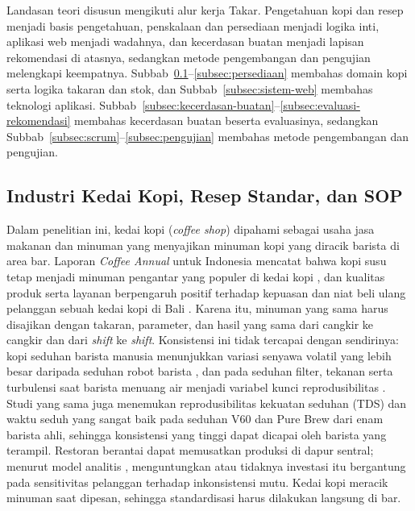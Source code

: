 Landasan teori disusun mengikuti alur kerja Takar. Pengetahuan kopi dan resep menjadi basis pengetahuan, penskalaan dan persediaan menjadi logika inti, aplikasi web menjadi wadahnya, dan kecerdasan buatan menjadi lapisan rekomendasi di atasnya, sedangkan metode pengembangan dan pengujian melengkapi keempatnya. Subbab~\ref{subsec:kedai-kopi}--\ref{subsec:persediaan} membahas domain kopi serta logika takaran dan stok, dan Subbab~\ref{subsec:sistem-web} membahas teknologi aplikasi. Subbab~\ref{subsec:kecerdasan-buatan}--\ref{subsec:evaluasi-rekomendasi} membahas kecerdasan buatan beserta evaluasinya, sedangkan Subbab~\ref{subsec:scrum}--\ref{subsec:pengujian} membahas metode pengembangan dan pengujian.

\subsection{Industri Kedai Kopi, Resep Standar, dan SOP}
\label{subsec:kedai-kopi}

Dalam penelitian ini, kedai kopi (\textit{coffee shop}) dipahami sebagai usaha jasa makanan dan minuman yang menyajikan minuman kopi yang diracik barista di area bar. Laporan \textit{Coffee Annual} untuk Indonesia mencatat bahwa kopi susu tetap menjadi minuman pengantar yang populer di kedai kopi \citep*{rahmanulloh2026coffee}, dan kualitas produk serta layanan berpengaruh positif terhadap kepuasan dan niat beli ulang pelanggan sebuah kedai kopi di Bali \citep*{natalia2023role}. Karena itu, minuman yang sama harus disajikan dengan takaran, parameter, dan hasil yang sama dari cangkir ke cangkir dan dari \textit{shift} ke \textit{shift}. Konsistensi ini tidak tercapai dengan sendirinya: kopi seduhan barista manusia menunjukkan variasi senyawa volatil yang lebih besar daripada seduhan robot barista \citep{park2023robot}, dan pada seduhan filter, tekanan serta turbulensi saat barista menuang air menjadi variabel kunci reprodusibilitas \citep{santanatoglia2023impact}. Studi yang sama juga menemukan reprodusibilitas kekuatan seduhan (TDS) dan waktu seduh yang sangat baik pada seduhan V60 dan Pure Brew dari enam barista ahli, sehingga konsistensi yang tinggi dapat dicapai oleh barista yang terampil. Restoran berantai dapat memusatkan produksi di dapur sentral; menurut model analitis \citet*{zhang2025improving}, menguntungkan atau tidaknya investasi itu bergantung pada sensitivitas pelanggan terhadap inkonsistensi mutu. Kedai kopi meracik minuman saat dipesan, sehingga standardisasi harus dilakukan langsung di bar.

